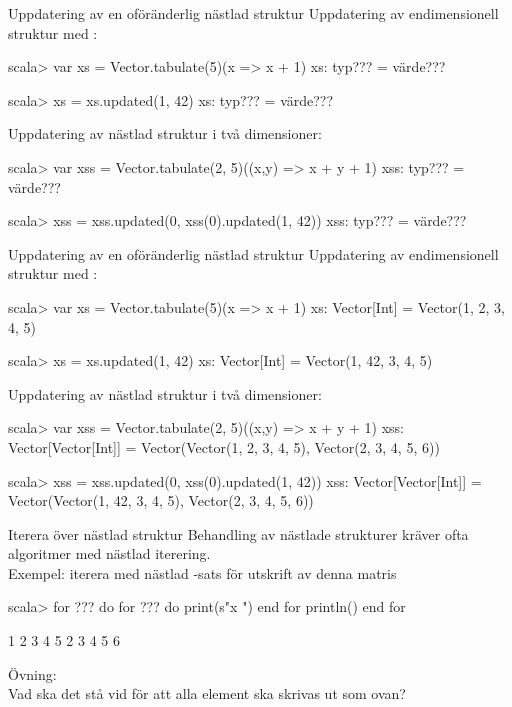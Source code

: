 \begin{Slide}{Uppdatering av en oföränderlig nästlad struktur}\SlideFontSmall
Uppdatering av endimensionell struktur med :\\
{\SlideFontTiny{} }
\begin{REPL}
scala> var xs = Vector.tabulate(5)(x => x + 1)
xs: typ??? = värde???

scala> xs = xs.updated(1, 42)
xs: typ??? = värde???
\end{REPL}

Uppdatering av nästlad struktur i två dimensioner:
\begin{REPL}
scala> var xss = Vector.tabulate(2, 5)((x,y) => x + y + 1)
xss:
  typ??? =
  värde???

scala> xss = xss.updated(0, xss(0).updated(1, 42))
xss:
  typ??? =
  värde???
\end{REPL}

\end{Slide}



\begin{Slide}{Uppdatering av en oföränderlig nästlad struktur}\SlideFontSmall
Uppdatering av endimensionell struktur med :\\
{\SlideFontTiny{} }
\begin{REPL}
scala> var xs = Vector.tabulate(5)(x => x + 1)
xs: Vector[Int] = Vector(1, 2, 3, 4, 5)

scala> xs = xs.updated(1, 42)
xs: Vector[Int] = Vector(1, 42, 3, 4, 5)
\end{REPL}

Uppdatering av nästlad struktur i två dimensioner:
\begin{REPL}
scala> var xss = Vector.tabulate(2, 5)((x,y) => x + y + 1)
xss: Vector[Vector[Int]] =
  Vector(Vector(1, 2, 3, 4, 5), Vector(2, 3, 4, 5, 6))

scala> xss = xss.updated(0, xss(0).updated(1, 42))
xss:
  Vector[Vector[Int]] =
  Vector(Vector(1, 42, 3, 4, 5), Vector(2, 3, 4, 5, 6))
\end{REPL}

\end{Slide}


\begin{Slide}{Iterera över nästlad struktur}\SlideFontSmall
Behandling av nästlade strukturer kräver ofta algoritmer med nästlad iterering. \\
Exempel: iterera med nästlad -sats för utskrift av denna matris\\
\pause
\begin{REPL}
scala> for ??? do
         for ??? do 
           print(s"x ")
         end for
         println()
       end for

1 2 3 4 5
2 3 4 5 6
\end{REPL}
Övning: \\Vad ska det stå vid  för att alla element ska skrivas ut som ovan?
\end{Slide}

